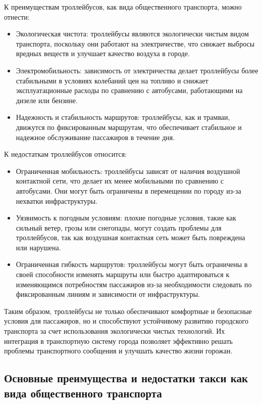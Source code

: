 К преимуществам троллейбусов, как вида общественного транспорта, можно отнести:
\begin{itemize}
	\item Экологическая чистота: троллейбусы являются экологически чистым видом транспорта, поскольку они работают на электричестве, что снижает выбросы вредных веществ и улучшает качество воздуха в городе.
	\item Электромобильность: зависимость от электричества делает троллейбусы более стабильными в условиях колебаний цен на топливо и снижает эксплуатационные расходы по сравнению с автобусами, работающими на дизеле или бензине.
	\item Надежность и стабильность маршрутов: троллейбусы, как и трамваи, движутся по фиксированным маршрутам, что обеспечивает стабильное и надежное обслуживание пассажиров в течение дня.
\end{itemize}

К недостаткам троллейбусов относится:
\begin{itemize}
	\item Ограниченная мобильность: троллейбусы зависят от наличия воздушной контактной сети, что делает их менее мобильными по сравнению с автобусами. Они могут быть ограничены в перемещении по городу из-за нехватки инфраструктуры.
	\item Уязвимость к погодным условиям: плохие погодные условия, такие как сильный ветер, грозы или снегопады, могут создать проблемы для троллейбусов, так как воздушная контактная сеть может быть повреждена или нарушена.
	\item Ограниченная гибкость маршрутов: троллейбусы могут быть ограничены в своей способности изменять маршруты или быстро адаптироваться к изменяющимся потребностям пассажиров из-за необходимости следовать по фиксированным линиям и зависимости от инфраструктуры.
\end{itemize}

Таким образом, троллейбусы не только обеспечивают комфортные и безопасные условия для пассажиров, но и способствуют устойчивому развитию городского транспорта за счет использования экологически чистых технологий. Их интеграция в транспортную систему города позволяет эффективно решать проблемы транспортного сообщения и улучшать качество жизни горожан.

\subsection{Основные преимущества и недостатки такси как вида общественного транспорта}

